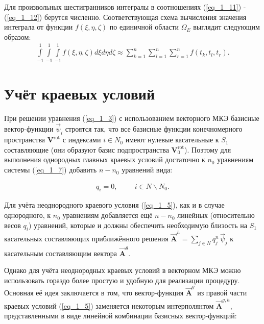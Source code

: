 Для произвольных шестигранников интегралы в соотношениях (\ref{eq_1_11}) - (\ref{eq_1_12}) берутся численно. Соответствующая схема вычисления значения интеграла от функции $f(\xi, \eta, \zeta)$ по единичной области $\Omega_E$ выглядит следующим образом:
\begin{equation} \label{eq_1_14}
	\begin{gathered}
		\int \limits_{-1}^1 \int \limits_{-1}^1 \int \limits_{-1}^1 f \left(\xi, \eta, \zeta\right) d\xi d\eta d\zeta \approx \sum_{k=1}^{n} \sum_{l=1}^{n} \sum_{r=1}^{n} f\left(t_k, t_l, t_r\right).
	\end{gathered}
\end{equation}

\section{Учёт краевых условий}

При решении уравнения (\ref{eq_1_3}) с использованием векторного МКЭ базисные вектор-функции $\overrightarrow{\psi}_i$ строятся так, что все базисные функции конечномерного пространства $\textbf{V}^\text{rot}$ с индексами $i \in N_0$ имеют нулевые касательные к $S_1$ составляющие (они образуют базис подпространства $\textbf{V}^\text{rot}_0$). Поэтому для выполнения однородных главных краевых условий достаточно к $n_0$ уравнениям системы (\ref{eq_1_7}) добавить $n - n_0$ уравнений вида:

\begin{equation*} \label{eq_1_15}
	\begin{gathered}
		q_i = 0, \hspace{1cm} i \in N \backslash N_0.
	\end{gathered}
\end{equation*}

Для учёта неоднородного краевого условия (\ref{eq_1_5}), как и в случае однородного, к $n_0$ уравнениям добавляется ещё $n - n_0$ линейных (относительно весов $q_i$) уравнений, которые и должны обеспечить необходимую близость на $S_1$ касательных составляющих приближённого решения $\overrightarrow{\textbf{A}}^h = \sum \limits_{j \in N} q_j^n \, \overrightarrow{\psi}_j$ к касательным составляющим вектора $\overrightarrow{\textbf{A}}^g$.

Однако для учёта неоднородных краевых условий в векторном МКЭ можно использовать гораздо более простую и удобную для реализации процедуру. Основная её идея заключается в том, что вектор-функция $\overrightarrow{\textbf{A}}^g$ из правой части краевых условий (\ref{eq_1_5}) заменяется некоторым интерполянтом $\overrightarrow{\textbf{A}}^{g,h}$, представленными в виде линейной комбинации базисных вектор-функций: 

